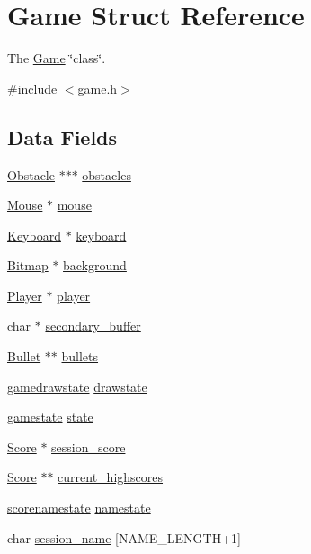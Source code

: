 \hypertarget{struct_game}{}\section{Game Struct Reference}
\label{struct_game}


The \hyperlink{struct_game}{Game} \char`\"{}class\char`\"{}.  




{\ttfamily \#include $<$game.\+h$>$}

\subsection*{Data Fields}
\begin{DoxyCompactItemize}
\item 
\hyperlink{struct_obstacle}{Obstacle} $\ast$$\ast$$\ast$ \hyperlink{struct_game_ab4a2d4a1db034550f0e6755c8417f00e}{obstacles}
\item 
\hyperlink{struct_mouse}{Mouse} $\ast$ \hyperlink{struct_game_a2514b83cbae6998a57eae74a24f6faf4}{mouse}
\item 
\hyperlink{struct_keyboard}{Keyboard} $\ast$ \hyperlink{struct_game_a945ceeb6236fbaf00dcdb7a0109f0d40}{keyboard}
\item 
\hyperlink{struct_bitmap}{Bitmap} $\ast$ \hyperlink{struct_game_a15de70574bc710486bf129a5c8f1634e}{background}
\item 
\hyperlink{struct_player}{Player} $\ast$ \hyperlink{struct_game_a96781128d3743da3d17e0fdd91afba7b}{player}
\item 
char $\ast$ \hyperlink{struct_game_a1820f1e9a26c0253b13be1df94052ca1}{secondary\+\_\+buffer}
\item 
\hyperlink{struct_bullet}{Bullet} $\ast$$\ast$ \hyperlink{struct_game_a6a95913dbac873584311bd479b43f911}{bullets}
\item 
\hyperlink{group__game_gab1e4078b5fa77cbf79de5e160f4cb261}{gamedrawstate} \hyperlink{struct_game_ab151fa4f58b0ddc30af7e501f6ba2ec3}{drawstate}
\item 
\hyperlink{group__game_ga33d4db650f69082296cc8c864c785e15}{gamestate} \hyperlink{struct_game_abb14911062a24c4178eb0f62fca2b925}{state}
\item 
\hyperlink{struct_score}{Score} $\ast$ \hyperlink{struct_game_ad7d780df0071261da7a401c839fa8a66}{session\+\_\+score}
\item 
\hyperlink{struct_score}{Score} $\ast$$\ast$ \hyperlink{struct_game_a544b8de55d5dc1667fad656b245d4a5a}{current\+\_\+highscores}
\item 
\hyperlink{group__game_ga74f568c551e9db616e8fae5ed65be48d}{scorenamestate} \hyperlink{struct_game_a49bcb1da4ed10a863fee60550febc40a}{namestate}
\item 
char \hyperlink{struct_game_a744d78025079ffc153f0be03356efdbe}{session\+\_\+name} \mbox{[}N\+A\+M\+E\+\_\+\+L\+E\+N\+G\+TH+1\mbox{]}
\end{DoxyCompactItemize}



